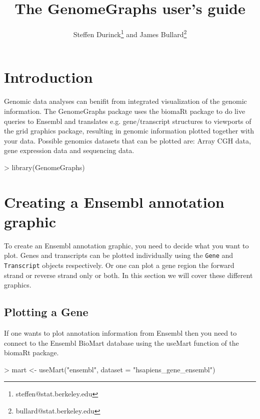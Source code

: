 \documentclass[11pt]{article}
\author{Steffen Durinck\footnote{steffen@stat.berkeley.edu} and James
  Bullard\footnote{bullard@stat.berkeley.edu}}
\newcommand{\Robject}[1]{{\texttt{#1}}}
\begin{document}
\title{The GenomeGraphs user's guide}

\maketitle

\tableofcontents
\section{Introduction}

Genomic data analyses can benifit from integrated visualization of the
genomic information.  The GenomeGraphs package uses the biomaRt
package to do live queries to Ensembl and translates
e.g. gene/transcript structures to viewports of the grid graphics
package, resulting in genomic information plotted together with your
data.  Possible genomics datasets that can be plotted are: Array CGH
data, gene expression data and sequencing data.

\begin{Schunk}
\begin{Sinput}
> library(GenomeGraphs)
\end{Sinput}
\end{Schunk}

\section{Creating a Ensembl annotation graphic}

To create an Ensembl annotation graphic, you need to decide what you
want to plot.  Genes and transcripts can be plotted individually using
the \Robject{Gene} and \Robject{Transcript} objects respectively.  Or
one can plot a gene region the forward strand or reverse strand only
or both.  In this section we will cover these different graphics.

\subsection{Plotting a Gene}

If one wants to plot annotation information from Ensembl then you need
to connect to the Ensembl BioMart database using the useMart function
of the biomaRt package.

\begin{Schunk}
\begin{Sinput}
> mart <- useMart("ensembl", dataset = "hsapiens_gene_ensembl")
\end{Sinput}
\end{Schunk}
\end{document}
